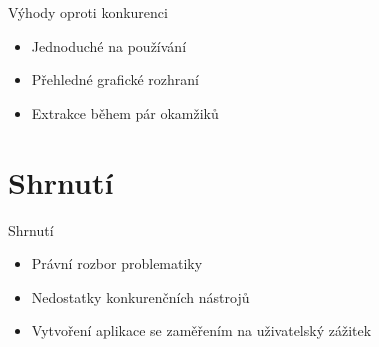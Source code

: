 \documentclass[czech,aspectratio=169]{beamer}
\begin{document}
	\begin{frame}
		\begin{center}
		\end{center}
	\end{frame}

	\begin{frame}{Výhody oproti konkurenci}
		\begin{itemize}
			\item Jednoduché na používání
			\item Přehledné grafické rozhraní
			\item Extrakce během pár okamžiků 
		\end{itemize}
	\end{frame}

	
	\section{Shrnutí}
	 \begin{frame}{Shrnutí}
	 	\begin{itemize}
	 		\item Právní rozbor problematiky
	 		\item Nedostatky konkurenčních nástrojů
	 		\item Vytvoření aplikace se zaměřením na uživatelský zážitek
	 	\end{itemize}
	 \end{frame}
 
	
\end{document}

